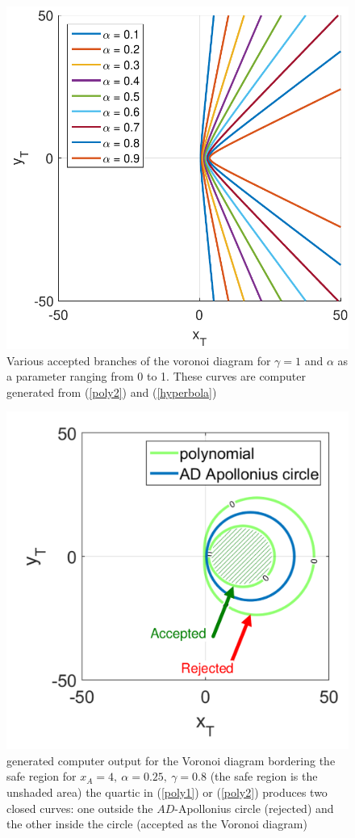 \documentclass[final,5p,times,twocolumn]{elsarticle}
\begin{document}
\begin{figure}[htb]
\centering
\includegraphics[width=0.75\columnwidth]{VAR_alpha_g_1.pdf}
\caption{Various accepted branches of the voronoi diagram for $\gamma=1$ and $\alpha$ as a parameter ranging from 0 to 1. These curves are computer generated from (\ref{poly2}) and (\ref{hyperbola})}
\label{VAR_alpha_gamma=1}
\end{figure}


\begin{figure}[htb]
\centering
\includegraphics[width=0.75\columnwidth]{marked_circle_curve_g_0p8.pdf}
\caption{generated computer output for the Voronoi diagram bordering the safe region for $x_A=4,\ \alpha=0.25,\ \gamma=0.8$ (the safe region is the unshaded area) the quartic in (\ref{poly1}) or (\ref{poly2}) produces two closed curves: one outside the $AD$-Apollonius circle (rejected) and the other inside the circle (accepted as the Voronoi diagram)}
\label{gamma=0.8}
\end{figure}
\end{document}
